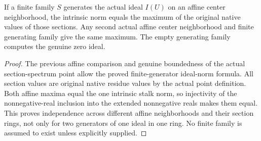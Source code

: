 \begin{theorem}
\label{scheme:native-model-ideal-generators}
\leanok
{}
If a finite family $S$ generates the actual ideal $I(U)$ on an affine
center neighborhood, the intrinsic norm equals the maximum of the
original native values of those sections. Any second actual affine center
neighborhood and finite generating family give the same maximum.
The empty generating family computes the genuine zero ideal.
\end{theorem}
\begin{proof}
The previous affine comparison and genuine boundedness of the actual
section-spectrum point allow the proved finite-generator ideal-norm
formula. All section values are original native residue values by the
actual point definition. Both affine maxima equal the one intrinsic
stalk norm, so injectivity of the nonnegative-real inclusion into the
extended nonnegative reals makes them equal. This proves independence
across different affine neighborhoods and their section rings, not only
for two generators of one ideal in one ring. No finite family is assumed
to exist unless explicitly supplied.
\end{proof}

